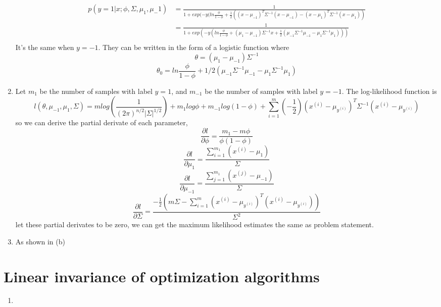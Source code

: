 \documentclass[12pt]{article}
\begin{document}
\begin{enumerate}[label=(\alph*)]
    \begin{equation*} 
        \begin{split}
            p(y=1|x;\phi, \Sigma, \mu_1, \mu_-1)
             &= \frac{1}{1+exp(-y(ln\frac{\phi}{1-\phi}+\frac{1}{2}((x-\mu_{-1})^T\Sigma^{-1}(x-\mu_{-1})-(x-\mu_{1})^T\Sigma^{-1}(x-\mu_{1}))} \\
             &= \frac{1}{1+exp(-y(ln\frac{\phi}{1-\phi}+(\mu_1-\mu_{-1})\Sigma^{-1}x+\frac{1}{2}(\mu_{-1}\Sigma^{-1}\mu_{-1}-\mu_{1}\Sigma^{-1}\mu_{1})))} \\
        \end{split}
    \end{equation*} 
    It's the same when $y=-1$. They can be written in the form of a logistic function where
    $$ \theta = (\mu_1-\mu_{-1})\Sigma^{-1} $$
    $$ \theta_0 = ln\frac{\phi}{1-\phi} + 1/2(\mu_{-1}\Sigma^{-1}\mu_{-1}-\mu_{1}\Sigma^{-1}\mu_{1}) $$

    \item 
    Let $m_1$ be the number of samples with label $y=1$, and $m_{-1}$ be the number of samples with label $y=-1$.
    The log-likelihood function is
    $$ l(\theta,\mu_{-1}, \mu_1, \Sigma)
       = mlog(\frac{1}{(2\pi)^{n/2}|\Sigma|^{1/2}})+m_1log\phi+m_{-1}log(1-\phi)
        +\sum_{i=1}^{m}(-\frac{1}{2})(x^{(i)}-\mu_{y^{(i)}})^T\Sigma^{-1}(x^{(i)}-\mu_{y^{(i)}}) $$
    so we can derive the partial derivate of each parameter,
    $$ \frac{\partial l}{\partial \phi} = \frac{m_1-m\phi}{\phi(1-\phi)}$$
    $$ \frac{\partial l}{\partial \mu_1} = \frac{\sum_{i=1}^{m_1}(x^{(i)}-\mu_1)}{\Sigma}$$
    $$ \frac{\partial l}{\partial \mu_{-1}} = \frac{\sum_{j=1}^{m_1}(x^{(j)}-\mu_{-1})}{\Sigma}$$
    $$ \frac{\partial l}{\partial \Sigma} = \frac{-\frac{1}{2}(m\Sigma-\sum_{i=1}^{m}(x^{(i)}-\mu_{y^(i)})^T(x^{(i)}-\mu_{y^(i)}))}{\Sigma^{2}}$$
    let these partial derivates to be zero, we can get the maximum likelihood estimates the same as problem statement. 

    \item
    As shown in (b)
    \end{enumerate}

    \newpage
    \section*{ Linear invariance of optimization algorithms  }
    \begin{enumerate}[label=(\alph*)]
    
    \item


    \end{enumerate}  
\end{document}
